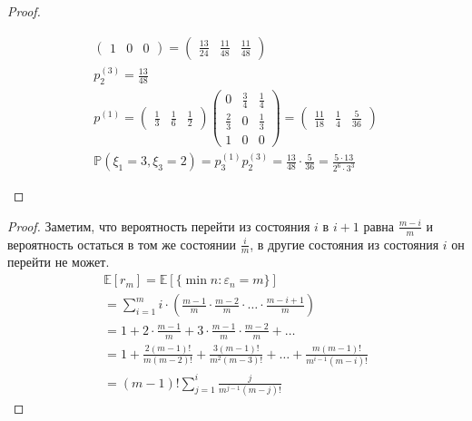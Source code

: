 \begin{proof}
\begin{itemize}
\begin{gather*}
\begin{pmatrix}
                1 & 0 & 0
            \end{pmatrix}
            =
            \begin{pmatrix}
                \frac{13}{24} & \frac{11}{48} & \frac{11}{48}
            \end{pmatrix}\\
            p_{2}^{(3)} = \frac{13}{48}\\
            p^{(1)} =
            \begin{pmatrix}
                \frac{1}{3} & \frac{1}{6} & \frac{1}{2}
            \end{pmatrix}
            \begin{pmatrix}
                0 & \frac{3}{4} & \frac{1}{4}\\
                \frac{2}{3} & 0 & \frac{1}{3}\\
                1 & 0 & 0
            \end{pmatrix}
            =
            \begin{pmatrix}
                \frac{11}{18} & \frac{1}{4} & \frac{5}{36}
            \end{pmatrix}\\
            \mathbb{P}(\xi_1 = 3, \xi_3 = 2)
            = p_3^{(1)} p_2^{(3)}
            = \frac{13}{48} \cdot \frac{5}{36}
            = \frac{5 \cdot 13}{2^6 \cdot 3^3}
        \end{gather*}
    \end{itemize}
    \end{proof}
\vskip 0.6in


    \begin{prob}
    \end{prob}
    \begin{proof}
        Заметим, что вероятность перейти из состояния $i$ в $i+1$ равна $\frac{m-i}{m}$ и вероятность остаться в том же состоянии $\frac{i}{m}$, в другие состояния из состояния $i$ он перейти не может.
        \begin{gather*}
            \mathbb{E}[r_m]
            = \mathbb{E}[\{\min n: \varepsilon_n = m\}]\\
            = \sum\limits_{i = 1}^{m} i \cdot \left(\frac{m-1}{m} \cdot \frac{m-2}{m} \cdot \ldots \cdot \frac{m-i+1}{m}\right)\\
            = 1 + 2 \cdot \frac{m-1}{m} + 3 \cdot \frac{m-1}{m} \cdot \frac{m-2}{m} + \ldots\\
            = 1 + \frac{2 (m-1)!}{m (m-2)!} + \frac{3(m-1)!}{m^2 (m-3)!} + \ldots + \frac{m (m-1)!}{m^{i-1} (m-i)!}\\
            = (m-1)! \sum\limits_{j=1}^{i} \frac{j}{m^{j-1} (m-j)!}
        \end{gather*}
    \end{proof}
